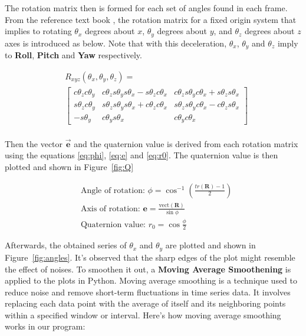 \documentclass[conference]{IEEEtran}
\begin{document}
The rotation matrix then is formed for each set of angles found in each frame. From the reference text book \cite{b2}, the rotation matrix for a fixed origin system that implies to rotating $\theta_x$ degrees about $x$, $\theta_y$ degrees about $y$, and $\theta_z$ degrees about $z$ axes is introduced as below. Note that with this deceleration, $\theta_x$, $\theta_y$ and $\theta_z$ imply to \textbf{Roll}, \textbf{Pitch} and \textbf{Yaw} respectively.

\begin{align}
  &R_{xyz}(\theta_x, \theta_y, \theta_z) = \\
  &\begin{bmatrix}
    c\theta_z c\theta_y & c\theta_z s\theta_y s\theta_x - s\theta_z c\theta_x & c\theta_z s\theta_y c\theta_x + s\theta_z s\theta_x \\
    s\theta_z c\theta_y & s\theta_z s\theta_y s \theta_x + c \theta_z  c \theta_x & s \theta_z s \theta_y c \theta_x -	c \theta_z s \theta_x \\
    -s\theta_y & c \theta_y s \theta_x & c \theta_y c\theta_x
  \end{bmatrix} \nonumber
\end{align} \\

Then the vector \( \vec{\mathbf{e}} \) and the quaternion value is derived from each rotation matrix using the equations \ref{eq:phi}, \ref{eq:e} and \ref{eq:r0}. The quaternion value is then plotted and shown in Figure~\ref{fig:Q}

\begin{align}
  &\text{Angle of rotation: } \phi = \cos ^{-1} \left(\frac{tr(\mathbf{R}) - 1}{2}\right) \label{eq:phi} \\
  &\text{Axis of rotation: } \mathbf{e} = \frac{\text{vect}(\mathbf{R})}{\sin \phi}       \label{eq:e} \\
  &\text{Quaternion value: } r_0 = \cos \frac{\phi}{2}  \label{eq:r0}
\end{align}

Afterwards, the obtained series of $\theta_x$ and $\theta_y$ are plotted and shown in Figure~\ref{fig:angles}. It's observed that the sharp edges of the plot might resemble the effect of noises. To smoothen it out, a \textbf{Moving Average Smoothening} is applied to the plots in Python. Moving average smoothing is a technique used to reduce noise and remove short-term fluctuations in time series data. It involves replacing each data point with the average of itself and its neighboring points within a specified window or interval. Here's how moving average smoothing works in our program: \\
\end{document}
